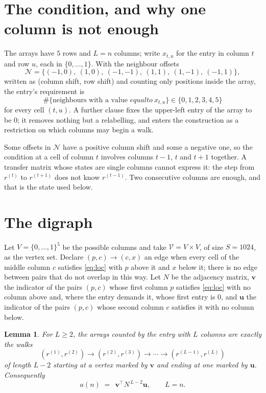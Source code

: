 \documentclass[11pt,a4paper]{article}
\theoremstyle{plain}
\newtheorem{lemma}[theorem]{Lemma}
\theoremstyle{definition}
\begin{document}
\section{The condition, and why one column is not enough}

The arrays have $5$ rows and $L=n$ columns; write $x_{t,u}$ for the entry in
column $t$ and row $u$, each in $\{0,\dots,1\}$. With the neighbour offsets
\[
\mathcal N=\{(-1,0),\ (1,0),\ (-1,-1),\ (1,1),\ (1,-1),\ (-1,1)\},
\]
written as (column shift, row shift) and counting only positions inside the array, the
entry's requirement is
\begin{equation}\label{eq:loc}
\#\{\text{neighbours with a value }equal to\ x_{t,u}\}\in\{0,1,2,3,4,5\}
\end{equation}
for every cell $(t,u)$. A further clause fixes the upper-left entry of the array to be $0$; it removes nothing but a relabelling, and enters the construction as a restriction on which columns may begin a walk.

Some offsets in $\mathcal N$ have a positive column shift and some a negative one, so the
condition at a cell of column $t$ involves columns $t-1$, $t$ and $t+1$ together. A transfer
matrix whose states are single columns cannot express it: the step from $r^{(t)}$ to
$r^{(t+1)}$ does not know $r^{(t-1)}$. Two consecutive columns are enough, and that is
the state used below.

\section{The digraph}

Let $V=\{0,\dots,1\}^{5}$ be the possible columns and take
$\mathcal V=V\times V$, of size $S=1024$, as the vertex set. Declare $(p,c)\to(c,x)$ an edge
when every cell of the middle column $c$ satisfies \eqref{eq:loc} with $p$ above it and $x$
below it; there is no edge between pairs that do not overlap in this way. Let $N$ be the
adjacency matrix, $\mathbf{v}$ the indicator of the pairs $(p,c)$ whose first column $p$
satisfies \eqref{eq:loc} with no column above and, where the entry demands it, whose first entry is $0$, and $\mathbf{u}$ the indicator of
the pairs $(p,c)$ whose second column $c$ satisfies it with no column below.

\begin{lemma}\label{lem:walk}
For $L\ge2$, the arrays counted by the entry with $L$ columns are exactly the walks
\[
(r^{(1)},r^{(2)})\to(r^{(2)},r^{(3)})\to\cdots\to(r^{(L-1)},r^{(L)})
\]
of length $L-2$ starting at a vertex marked by $\mathbf{v}$ and ending at one marked by
$\mathbf{u}$. Consequently
\[
a(n)\;=\;\,\mathbf{v}^{\!\top}N^{\,L-2}\mathbf{u},\qquad L=n .
\]
\end{lemma}
\end{document}
